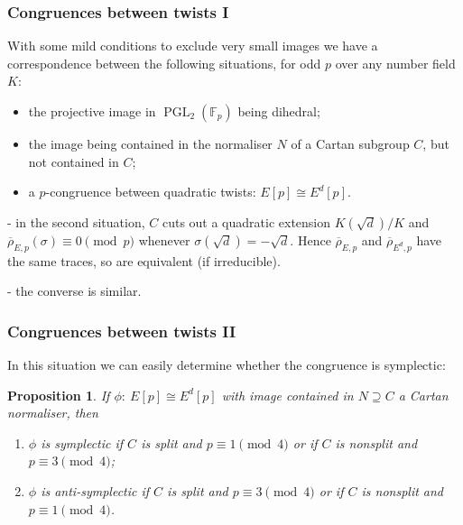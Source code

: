 \documentclass[compress]{beamer}
\newtheorem{prop}{Proposition}
\newcommand{\rhobar}{\overline{\rho}}
\newcommand{\F}{\mathbb F}
\newcommand{\PGL}{\operatorname{PGL}}
\begin{document}
\begin{frame}\frametitle{Congruences between twists I}
With some mild conditions to exclude very small images we have a
correspondence between the following situations, for odd $p$ over any
number field $K$:
\begin{itemize}
\item the projective image in $\PGL_2(\F_p)$ being dihedral;
\item the image being contained in the normaliser $N$ of a Cartan
  subgroup $C$, but not contained in $C$;
  \item a $p$-congruence between quadratic twists: $E[p]\cong E^d[p]$.
\end{itemize}
\pause\medskip

- in the second situation, $C$ cuts out a quadratic extension
$K(\sqrt{d})/K$ and $\rhobar_{E,p}(\sigma)\equiv0\pmod{p}$ whenever
$\sigma(\sqrt{d})=-\sqrt{d}$.  Hence $\rhobar_{E,p}$ and
$\rhobar_{E^d,p}$ have the same traces, so are equivalent (if
irreducible).
\pause\medskip

- the converse is similar.
\end{frame}

\begin{frame}\frametitle{Congruences between twists II}
  In this situation we can easily determine whether the congruence is
  symplectic:
  \pause  \medskip

  \begin{prop}
  If $\phi:\ E[p]\cong E^d[p]$ with image contained in $N\supseteq C$ a
  Cartan normaliser, then%
  \begin{enumerate}
    \item $\phi$ is symplectic if $C$ is split and $p\equiv1\pmod4$ or
      if $C$ is nonsplit and $p\equiv3\pmod4$;
      \item $\phi$ is anti-symplectic if $C$ is split and $p\equiv3\pmod4$ or
      if $C$ is nonsplit and $p\equiv1\pmod4$.
  \end{enumerate}

  \end{prop}

\end{frame}
\end{document}
